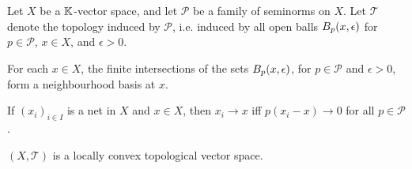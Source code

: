 \documentclass[article, a4paper, 11pt, oneside]{memoir}
\numberwithin{equation}{chapter}
\newcommand{\calT}{\mathcal{T}}
\newcommand{\calB}{\mathcal{B}}
\newcommand{\calP}{\mathcal{P}}
\begin{document}




\begin{theorem}
    \label{thm:seminorm-topology}
    Let $X$ be a $\field$-vector space, and let $\calP$ be a family of seminorms on $X$. Let $\calT$ denote the topology induced by $\calP$, i.e. induced by all open balls $\ball[p]{x}{\epsilon}$ for $p \in \calP$, $x \in X$, and $\epsilon > 0$.

    \begin{enumthm}
        \item For each $x \in X$, the finite intersections of the sets $\ball[p]{x}{\epsilon}$, for $p \in \calP$ and $\epsilon > 0$, form a neighbourhood basis at $x$.

        \item If $(x_i)_{i \in I}$ is a net in $X$ and $x \in X$, then $x_i \to x$ iff $p(x_i - x) \to 0$ for all $p \in \calP$.

        \item $(X,\calT)$ is a locally convex topological vector space.
    \end{enumthm}
\end{theorem}
\end{document}
